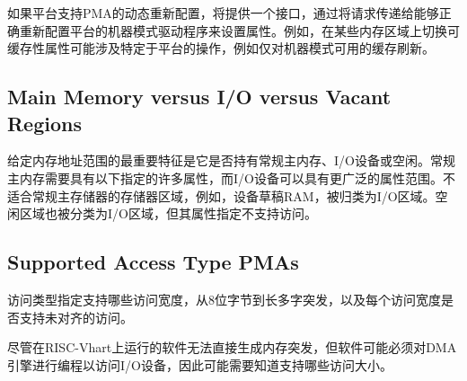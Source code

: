 {\iffalse
Where platforms support dynamic reconfiguration of PMAs, an interface
will be provided to set the attributes by passing requests to a
machine-mode driver that can correctly reconfigure the platform.  For
example, switching cacheability attributes on some memory regions
might involve platform-specific operations, such as cache flushes,
that are available only to machine-mode.
\fi
如果平台支持PMA的动态重新配置，将提供一个接口，通过将请求传递给能够正确重新配置平台的机器模式驱动程序来设置属性。例如，在某些内存区域上切换可缓存性属性可能涉及特定于平台的操作，例如仅对机器模式可用的缓存刷新。

\subsection{Main Memory versus I/O versus Vacant Regions}

\iffalse
The most important characterization of a given memory address range is
whether it holds regular main memory, or I/O devices, or is vacant.
Regular main memory is required to have a number of properties,
specified below, whereas I/O devices can have a much broader range of
attributes.  Memory regions that do not fit into regular main
memory, for example, device scratchpad RAMs, are categorized as I/O
regions.  Vacant regions are also classified as I/O regions but with
attributes specifying that no accesses are supported.
\fi
给定内存地址范围的最重要特征是它是否持有常规主内存、I/O设备或空闲。常规主内存需要具有以下指定的许多属性，而I/O设备可以具有更广泛的属性范围。不适合常规主存储器的存储器区域，例如，设备草稿RAM，被归类为I/O区域。空闲区域也被分类为I/O区域，但其属性指定不支持访问。

\subsection{Supported Access Type PMAs}

\iffalse
Access types specify which access widths, from 8-bit byte to long
multi-word burst, are supported, and also whether misaligned accesses
are supported for each access width.
\fi
访问类型指定支持哪些访问宽度，从8位字节到长多字突发，以及每个访问宽度是否支持未对齐的访问。

\iffalse
\begin{commentary}
Although software running on a RISC-V hart cannot directly generate
bursts to memory, software might have to program DMA engines to access
I/O devices and might therefore need to know which access sizes are
supported.
\end{commentary}
\fi
\begin{commentary}
尽管在RISC-Vhart上运行的软件无法直接生成内存突发，但软件可能必须对DMA引擎进行编程以访问I/O设备，因此可能需要知道支持哪些访问大小。
\end{commentary}

}
